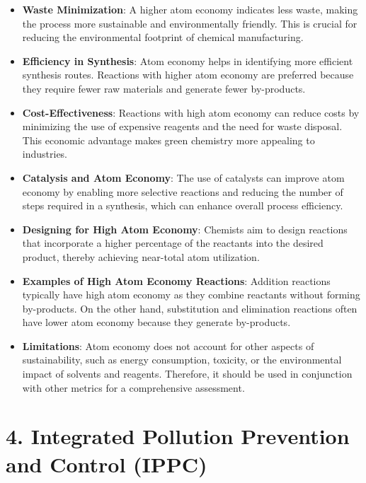 \documentclass[11pt]{article}
\begin{document}
\begin{itemize}
	\item \textbf{Waste Minimization}: A higher atom economy indicates less waste, making the process more sustainable and environmentally friendly. This is crucial for reducing the environmental footprint of chemical manufacturing.

	\item \textbf{Efficiency in Synthesis}: Atom economy helps in identifying more efficient synthesis routes. Reactions with higher atom economy are preferred because they require fewer raw materials and generate fewer by-products.

	\item \textbf{Cost-Effectiveness}: Reactions with high atom economy can reduce costs by minimizing the use of expensive reagents and the need for waste disposal. This economic advantage makes green chemistry more appealing to industries.

	\item \textbf{Catalysis and Atom Economy}: The use of catalysts can improve atom economy by enabling more selective reactions and reducing the number of steps required in a synthesis, which can enhance overall process efficiency.

	\item \textbf{Designing for High Atom Economy}: Chemists aim to design reactions that incorporate a higher percentage of the reactants into the desired product, thereby achieving near-total atom utilization.

	\item \textbf{Examples of High Atom Economy Reactions}: Addition reactions typically have high atom economy as they combine reactants without forming by-products. On the other hand, substitution and elimination reactions often have lower atom economy because they generate by-products.

	\item \textbf{Limitations}: Atom economy does not account for other aspects of sustainability, such as energy consumption, toxicity, or the environmental impact of solvents and reagents. Therefore, it should be used in conjunction with other metrics for a comprehensive assessment.
\end{itemize}

\section{4. Integrated Pollution Prevention and Control (IPPC)}
\end{document}
